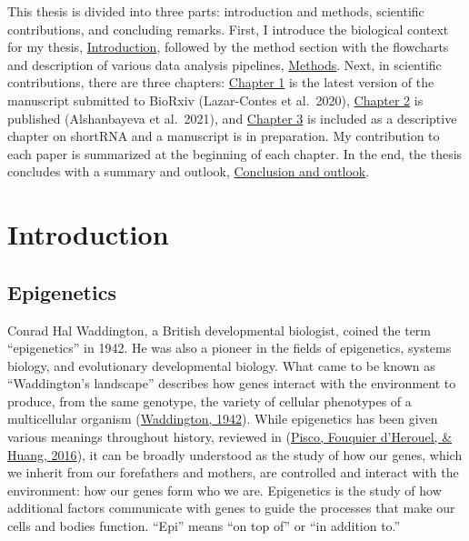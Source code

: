 \documentclass[12pt,twoside]{reedthesis}
\begin{document}
This thesis is divided into three parts: introduction and methods, scientific contributions, and concluding remarks. First, I introduce the biological context for my thesis, \protect\hyperlink{intro}{Introduction}, followed by the method section with the flowcharts and description of various data analysis pipelines, \protect\hyperlink{methods}{Methods}. Next, in scientific contributions, there are three chapters: \protect\hyperlink{chapter1}{Chapter 1} is the latest version of the manuscript submitted to BioRxiv (Lazar-Contes et al.~2020), \protect\hyperlink{chapter2}{Chapter 2} is published (Alshanbayeva et al.~2021), and \protect\hyperlink{chapter3}{Chapter 3} is included as a descriptive chapter on shortRNA and a manuscript is in preparation. My contribution to each paper is summarized at the beginning of each chapter. In the end, the thesis concludes with a summary and outlook, \protect\hyperlink{conclusion}{Conclusion and outlook}.

\hypertarget{intro}{%
\chapter*{Introduction}\label{intro}}

\hypertarget{epigenetics}{%
\section*{Epigenetics}\label{epigenetics}}

Conrad Hal Waddington, a British developmental biologist, coined the
term ``epigenetics'' in 1942. He was also a pioneer in the fields of
epigenetics, systems biology, and evolutionary developmental biology.
What came to be known as ``Waddington's landscape'' describes how genes
interact with the environment to produce, from the same genotype, the
variety of cellular phenotypes of a multicellular organism
(\protect\hyperlink{ref-waddington_1942}{Waddington, 1942}). While epigenetics has been given various meanings
throughout history, reviewed in (\protect\hyperlink{ref-pisco2016}{Pisco, Fouquier d'Herouel, \& Huang, 2016}), it can be broadly
understood as the study of how our genes, which we inherit from our
forefathers and mothers, are controlled and interact with the
environment: how our genes form who we are. Epigenetics is the study of
how additional factors communicate with genes to guide the processes
that make our cells and bodies function. ``Epi'' means ``on top of'' or ``in
addition to.''
\end{document}
